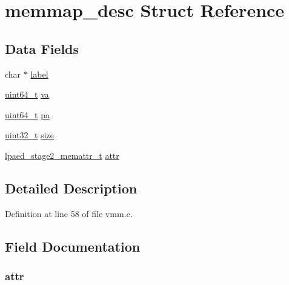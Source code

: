 \hypertarget{structmemmap__desc}{\section{memmap\-\_\-desc \-Struct \-Reference}
\label{structmemmap__desc}
}
\subsection*{\-Data \-Fields}
\begin{DoxyCompactItemize}
\item 
char $\ast$ \hyperlink{structmemmap__desc_acf60de4c64d60c1b9449c056bc6bfcf7}{label}
\item 
\hyperlink{arch__types_8h_aaa5d1cd013383c889537491c3cfd9aad}{uint64\-\_\-t} \hyperlink{structmemmap__desc_a95ee4f2c3d5eef08e655768b207f5d61}{va}
\item 
\hyperlink{arch__types_8h_aaa5d1cd013383c889537491c3cfd9aad}{uint64\-\_\-t} \hyperlink{structmemmap__desc_ac3bd9bdf9d7c837b3f990461d5c7fb19}{pa}
\item 
\hyperlink{arch__types_8h_a435d1572bf3f880d55459d9805097f62}{uint32\-\_\-t} \hyperlink{structmemmap__desc_ab2c6b258f02add8fdf4cfc7c371dd772}{size}
\item 
\hyperlink{lpae_8h_a05d556a9b3ba68a3bafcc96839956371}{lpaed\-\_\-stage2\-\_\-memattr\-\_\-t} \hyperlink{structmemmap__desc_aa13b236533a7e5005e2272face6b512d}{attr}
\end{DoxyCompactItemize}


\subsection{\-Detailed \-Description}


\-Definition at line 58 of file vmm.\-c.



\subsection{\-Field \-Documentation}
\hypertarget{structmemmap__desc_aa13b236533a7e5005e2272face6b512d}{
\subsubsection[{attr}]{ {\bf attr}}}\label{structmemmap__desc_aa13b236533a7e5005e2272face6b512d}


